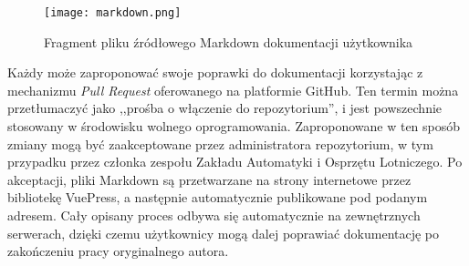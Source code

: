 \begin{figure}[!h]
    \centering \texttt{[image: markdown.png]}
    \caption{Fragment pliku źródłowego Markdown dokumentacji użytkownika}
    \label{fig:markdown}
\end{figure}

Każdy może zaproponować swoje poprawki do dokumentacji korzystając z mechanizmu \emph{Pull Request} oferowanego na platformie GitHub\cite{soft:github}. Ten termin można przetłumaczyć jako ,,prośba o włączenie do repozytorium'', i jest powszechnie stosowany w środowisku wolnego oprogramowania. Zaproponowane w ten sposób zmiany mogą być zaakceptowane przez administratora repozytorium, w tym przypadku przez członka zespołu Zakładu Automatyki i Osprzętu Lotniczego. Po akceptacji, pliki Markdown są przetwarzane na strony internetowe przez bibliotekę VuePress\cite{soft:vuepress}, a następnie automatycznie publikowane pod podanym adresem. Cały opisany proces odbywa się automatycznie na zewnętrznych serwerach, dzięki czemu użytkownicy mogą dalej poprawiać dokumentację po zakończeniu pracy oryginalnego autora.
